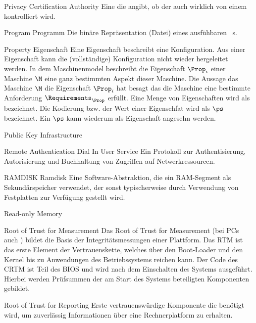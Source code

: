 	{Privacy Certification Authority}
	{Eine \TTP die angibt, ob der \AIK auch wirklich von einem \TPM kontrolliert 
	wird.}

\glosentry
	{Program}
	{Programm}
	{Die bin\"are Repr\"asentation (Datei) eines ausf\"uhbaren \Compartment~s.}
	
\glosentry
	{Property}
	{Eigenschaft}
	{Eine Eigenschaft beschreibt eine Konfiguration. Aus einer
	 Eigenschaft kann die (vollst\"andige) Konfiguration nicht 
	 wieder hergeleitet werden. In dem Maschinenmodel beschreibt die
	 Eigenschaft $\Prop_i$ einer Maschine $\M$ eine ganz bestimmten
	 Aspekt dieser Maschine. Die Aussage das Maschine $\M$ die Eigenschaft
	 $\Prop_i$ hat besagt das die Maschine eine bestimmte Anforderung
	 $\Requirements_\Prop$ erf\"ullt.
	 Eine Menge von Eigenschaften wird als \PropSet bezeichnet. 
	 Die Kodierung bzw. der Wert einer Eigenschfat wird als $\ps$
	 bezeichnet. Ein $\ps$ kann wiederum als Eigenschaft angesehn werden.
	 }
	 

	{Public Key Infrastructure}


        {Remote Authentication Dial In User Service}
        {Ein Protokoll zur Authentisierung, Autorisierung und Buchhaltung
         von Zugriffen auf Netwerkressourcen.}

\glosentry
        {RAMDISK}
        {Ramdisk}
        {Eine Software-Abstraktion, die ein RAM-Segment als Sekund\"arspeicher
	 verwendet, der sonst typischerweise durch Verwendung von Festplatten
	 zur Verf\"ugung gestellt wird.}


	{Read-only Memory}

	{Root of Trust for Measurement}
	{Das Root of Trust for Measurement (bei PCs auch \CRTM) bildet die Basis der Integrit\"atsmessungen einer Plattform. Das RTM ist das erste Element der Vertrauenskette, welches \"uber den Boot-Loader und den Kernel bis zu Anwendungen des Betriebssystems reichen kann. Der Code des CRTM ist Teil des BIOS und wird nach dem Einschalten des Systems ausgef\"uhrt. Hierbei werden Pr\"ufsummen der am Start des Systems beteiligten Komponenten gebildet.}


	{Root of Trust for Reporting}
	{Erste vertrauensw\"urdige Komponente die ben\"otigt wird, um 
	zuverl\"assig Informationen \"uber eine Rechnerplatform zu erhalten. }

